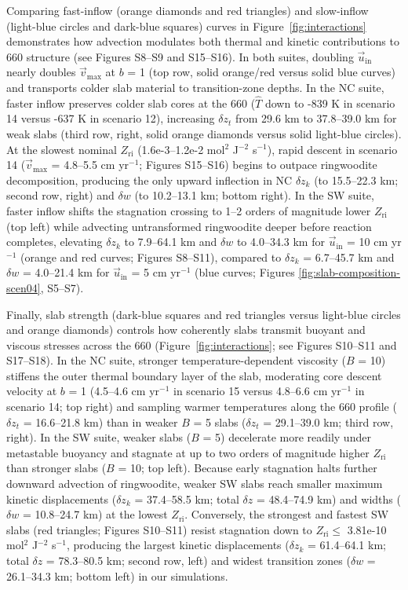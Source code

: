 \documentclass[draft,linenumbers]{agujournal2019}
\begin{document}
Comparing fast-inflow (orange diamonds and red triangles) and
slow-inflow (light-blue circles and dark-blue squares) curves in
Figure~\ref{fig:interactions} demonstrates how advection modulates both
thermal and kinetic contributions to 660 structure (see Figures S8--S9
and S15--S16). In both suites, doubling \(\vec{u}_\mathrm{in}\) nearly
doubles \(\vec{v}_\mathrm{max}\) at \(b\) = 1 (top row, solid orange/red
versus solid blue curves) and transports colder slab material to
transition-zone depths. In the NC suite, faster inflow preserves colder
slab cores at the 660 (\(\hat{T}\) down to -839 K in scenario 14 versus
-637 K in scenario 12), increasing \(\delta z_t\) from 29.6 km to
37.8--39.0 km for weak slabs (third row, right, solid orange diamonds
versus solid light-blue circles). At the slowest nominal
\(Z_\mathrm{ri}\) (1.6e-3--1.2e-2 mol\(^2\) J\(^{-2}\) s\(^{-1}\)),
rapid descent in scenario 14 (\(\vec{v}_\mathrm{max}\) = 4.8--5.5 cm
yr\(^{-1}\); Figures S15--S16) begins to outpace ringwoodite
decomposition, producing the only upward inflection in NC \(\delta z_k\)
(to 15.5--22.3 km; second row, right) and \(\delta w\) (to 10.2--13.1
km; bottom right). In the SW suite, faster inflow shifts the stagnation
crossing to 1--2 orders of magnitude lower \(Z_\mathrm{ri}\) (top left)
while advecting untransformed ringwoodite deeper before reaction
completes, elevating \(\delta z_k\) to 7.9--64.1 km and \(\delta w\) to
4.0--34.3 km for \(\vec{u}_\mathrm{in}\) = 10 cm yr\(^{-1}\) (orange and
red curves; Figures S8--S11), compared to \(\delta z_k\) = 6.7--45.7 km
and \(\delta w\) = 4.0--21.4 km for \(\vec{u}_\mathrm{in}\) = 5 cm
yr\(^{-1}\) (blue curves; Figures \ref{fig:slab-composition-scen04},
S5--S7).

Finally, slab strength (dark-blue squares and red triangles versus
light-blue circles and orange diamonds) controls how coherently slabs
transmit buoyant and viscous stresses across the 660
(Figure~\ref{fig:interactions}; see Figures S10--S11 and S17--S18). In
the NC suite, stronger temperature-dependent viscosity (\(B\) = 10)
stiffens the outer thermal boundary layer of the slab, moderating core
descent velocity at \(b\) = 1 (4.5--4.6 cm yr\(^{-1}\) in scenario 15
versus 4.8--6.6 cm yr\(^{-1}\) in scenario 14; top right) and sampling
warmer temperatures along the 660 profile (\(\delta z_t\) = 16.6--21.8
km) than in weaker \(B\) = 5 slabs (\(\delta z_t\) = 29.1--39.0 km;
third row, right). In the SW suite, weaker slabs (\(B\) = 5) decelerate
more readily under metastable buoyancy and stagnate at up to two orders
of magnitude higher \(Z_\mathrm{ri}\) than stronger slabs (\(B\) = 10;
top left). Because early stagnation halts further downward advection of
ringwoodite, weaker SW slabs reach smaller maximum kinetic displacements
(\(\delta z_k\) = 37.4--58.5 km; total \(\delta z\) = 48.4--74.9 km) and
widths (\(\delta w\) = 10.8--24.7 km) at the lowest \(Z_\mathrm{ri}\).
Conversely, the strongest and fastest SW slabs (red triangles; Figures
S10--S11) resist stagnation down to \(Z_\mathrm{ri} \leq\) 3.81e-10
mol\(^2\) J\(^{-2}\) s\(^{-1}\), producing the largest kinetic
displacements (\(\delta z_k\) = 61.4--64.1 km; total \(\delta z\) =
78.3--80.5 km; second row, left) and widest transition zones
(\(\delta w\) = 26.1--34.3 km; bottom left) in our simulations.
\end{document}
